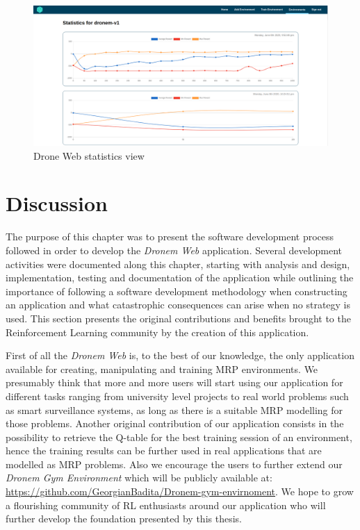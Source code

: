 \begin{figure}[!htb]
    \centering
    \includegraphics[scale=0.22]{Figures/statisticsView.png}
    \caption{Drone Web statistics view}
    \label{fig:statisticsView}
\end{figure}


\section{Discussion}\label{softDiscussionn}
The purpose of this chapter was to present the software development process followed in order to develop the \emph{Dronem Web} application. Several development activities were documented along this chapter, starting with analysis and design, implementation, testing and documentation of the application while outlining the importance of following a software development methodology when constructing an application and what catastrophic consequences can arise when no strategy is used. This section presents the original contributions and benefits brought to the Reinforcement Learning community by the creation of this application.

\par First of all the \emph{Dronem Web} is, to the best of our knowledge, the only application available for creating, manipulating and training MRP environments. We presumably think that more and more users will start using our application for different tasks ranging from university level projects to real world problems such as smart surveillance systems, as long as there is a suitable MRP modelling for those problems. Another original contribution of our application consists in the possibility to retrieve the Q-table for the best training session of an environment, hence the training results can be further used in real applications that are modelled as MRP problems. Also we encourage the users to further extend our \emph{Dronem Gym Environment} which will be publicly available at: \url{https://github.com/GeorgianBadita/Dronem-gym-envirnoment}. We hope to grow a flourishing community of RL enthusiasts around our application who will further develop the foundation presented by this thesis.

